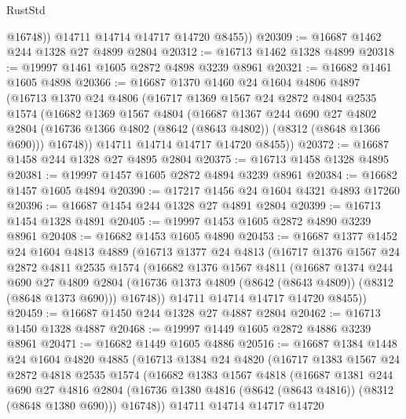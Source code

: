 \begin{lexlean}{RustStd}
\begin{coremodule}
            @16748))
        @14711
        @14714
        @14717
        @14720
        @8455))
@20309 := @16687 @1462 @244 @1328 @27 @4899 @2804
@20312 := @16713 @1462 @1328 @4899
@20318 := @19997 @1461 @1605 @2872 @4898 @3239 @8961
@20321 := @16682 @1461 @1605 @4898
@20366 := @16687
    @1370
    @1460
    @24
    @1604
    @4806
    @4897
    (@16713
      @1370
      @24
      @4806
      (@16717
        @1369
        @1567
        @24
        @2872
        @4804
        @2535
        @1574
        (@16682
          @1369
          @1567
          @4804
          (@16687
            @1367
            @244
            @690
            @27
            @4802
            @2804
            (@16736 @1366 @4802 (@8642 (@8643 @4802)) (@8312 (@8648 @1366 @690)))
            @16748))
        @14711
        @14714
        @14717
        @14720
        @8455))
@20372 := @16687 @1458 @244 @1328 @27 @4895 @2804
@20375 := @16713 @1458 @1328 @4895
@20381 := @19997 @1457 @1605 @2872 @4894 @3239 @8961
@20384 := @16682 @1457 @1605 @4894
@20390 := @17217 @1456 @24 @1604 @4321 @4893 @17260
@20396 := @16687 @1454 @244 @1328 @27 @4891 @2804
@20399 := @16713 @1454 @1328 @4891
@20405 := @19997 @1453 @1605 @2872 @4890 @3239 @8961
@20408 := @16682 @1453 @1605 @4890
@20453 := @16687
    @1377
    @1452
    @24
    @1604
    @4813
    @4889
    (@16713
      @1377
      @24
      @4813
      (@16717
        @1376
        @1567
        @24
        @2872
        @4811
        @2535
        @1574
        (@16682
          @1376
          @1567
          @4811
          (@16687
            @1374
            @244
            @690
            @27
            @4809
            @2804
            (@16736 @1373 @4809 (@8642 (@8643 @4809)) (@8312 (@8648 @1373 @690)))
            @16748))
        @14711
        @14714
        @14717
        @14720
        @8455))
@20459 := @16687 @1450 @244 @1328 @27 @4887 @2804
@20462 := @16713 @1450 @1328 @4887
@20468 := @19997 @1449 @1605 @2872 @4886 @3239 @8961
@20471 := @16682 @1449 @1605 @4886
@20516 := @16687
    @1384
    @1448
    @24
    @1604
    @4820
    @4885
    (@16713
      @1384
      @24
      @4820
      (@16717
        @1383
        @1567
        @24
        @2872
        @4818
        @2535
        @1574
        (@16682
          @1383
          @1567
          @4818
          (@16687
            @1381
            @244
            @690
            @27
            @4816
            @2804
            (@16736 @1380 @4816 (@8642 (@8643 @4816)) (@8312 (@8648 @1380 @690)))
            @16748))
        @14711
        @14714
        @14717
        @14720

\end{coremodule}
\end{lexlean}

